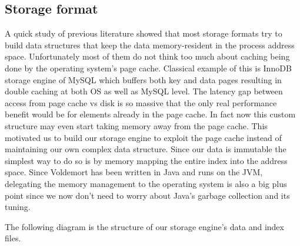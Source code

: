 \documentclass[10pt,twocolumn,preprint,natbib,authoryear]{sigplanconf}
\begin{document}

\subsection{Storage format}
\label{sec:read_only:storage_format}

A quick study of previous literature showed that most storage formats try to build data structures that keep the data memory-resident in the process address space. Unfortunately most of them do not think too much about caching being done by the operating system's page cache. Classical example of this is InnoDB storage engine of MySQL which buffers both key and data pages resulting in double caching 
at both OS as well as MySQL level. The latency gap between access from page cache vs disk is so massive that the only real performance benefit would be for elements already in the page cache. In fact now this custom structure may even start taking memory away from the page cache. This motivated us to build our storage engine to exploit the page cache instead of maintaining our own complex data structure. Since our data is immutable the simplest way to do so is by memory mapping the entire index into the address space. Since Voldemort has been written in Java and runs on the JVM, delegating the memory management to the operating system is also a big plus point since we now don't need to worry about Java's garbage collection and its tuning.

The following diagram is the structure of our storage engine's data and index files. 
\end{document}

